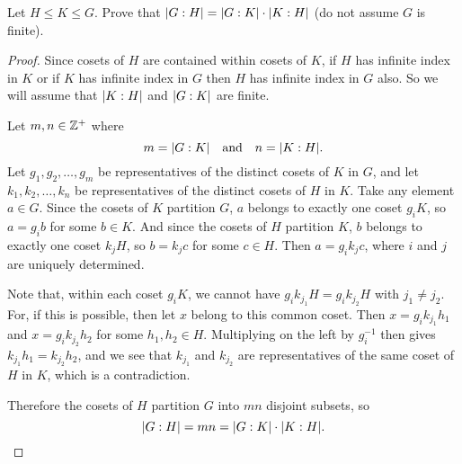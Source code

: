 \label{exercise:quotient-group:subgroup-of-subgroup-index}
Let $H\leq K\leq G$. Prove that $\lvert{G:H}\rvert = \lvert{G:K}\rvert\cdot\lvert{K:H}\rvert$
(do not assume $G$ is finite).
\begin{proof}
  Since cosets of $H$ are contained within cosets of $K$, if $H$ has
  infinite index in $K$ or if $K$ has infinite index in $G$ then $H$
  has infinite index in $G$ also. So we will assume that $\lvert{K:H}\rvert$
  and $\lvert{G:K}\rvert$ are finite.

  Let $m,n\in\mathbb{Z}^+$ where
  \begin{equation*}
    m = \lvert{G:K}\rvert
    \quad\text{and}\quad
    n = \lvert{K:H}\rvert.
  \end{equation*}
  Let $g_1,g_2,\dots,g_m$ be representatives of the distinct cosets of
  $K$ in $G$, and let $k_1,k_2,\dots,k_n$ be representatives of the
  distinct cosets of $H$ in $K$. Take any element $a\in G$. Since the
  cosets of $K$ partition $G$, $a$ belongs to exactly one coset
  $g_iK$, so $a = g_ib$ for some $b\in K$. And since the cosets of $H$
  partition $K$, $b$ belongs to exactly one coset $k_jH$, so
  $b = k_jc$ for some $c\in H$. Then $a = g_ik_jc$, where $i$ and $j$
  are uniquely determined.

  Note that, within each coset $g_iK$, we cannot have
  $g_ik_{j_1}H = g_ik_{j_2}H$ with $j_1\neq j_2$. For, if this is
  possible, then let $x$ belong to this common coset. Then
  $x = g_ik_{j_1}h_1$ and $x = g_ik_{j_2}h_2$ for some $h_1,h_2\in
  H$. Multiplying on the left by $g_i^{-1}$ then gives
  $k_{j_1}h_1 = k_{j_2}h_2$, and we see that $k_{j_1}$ and $k_{j_2}$
  are representatives of the same coset of $H$ in $K$, which is a
  contradiction.

  Therefore the cosets of $H$ partition $G$ into $mn$ disjoint
  subsets, so
  \begin{equation*}
    \lvert{G:H}\rvert = mn = \lvert{G:K}\rvert\cdot\lvert{K:H}\rvert. \qedhere
  \end{equation*}
\end{proof}

